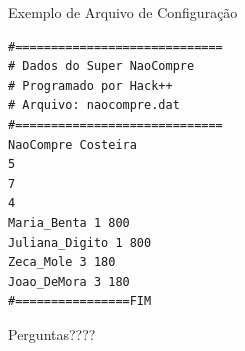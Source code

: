 \documentclass[12pt,table,xcolor={dvipsnames}]{beamer}
\begin{document}
\begin{frame}[fragile]{Exemplo de Arquivo de Configuração}


\begin{lstlisting}
#============================= 
# Dados do Super NaoCompre 
# Programado por Hack++ 
# Arquivo: naocompre.dat 
#============================= 
NaoCompre Costeira 
5 
7 
4 
Maria_Benta 1 800 
Juliana_Digito 1 800 
Zeca_Mole 3 180 
Joao_DeMora 3 180 
#================FIM 
\end{lstlisting}
\end{frame}










{
\begin{frame}

{\LARGE Perguntas????}

\end{frame}
}
\end{document}

